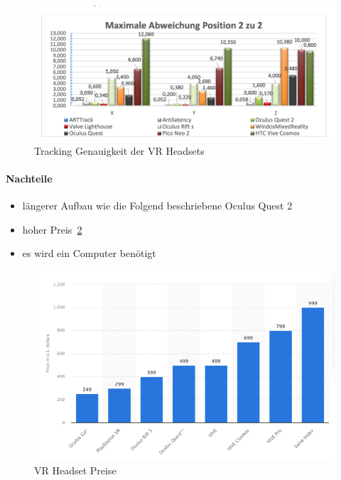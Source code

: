 \begin{figure}
    \centering
    \includegraphics[scale=0.4]{pics/tracking_precision_statistic}
    \caption{Tracking Genauigkeit der VR Headsets~\cite{Macedo_2020}}
    \label{fig:tracking_precision_statistic}
\end{figure}

\paragraph{Nachteile}

\begin{itemize}
    \item längerer Aufbau wie die Folgend beschriebene Oculus Quest 2
    \item hoher Preis~\ref{fig:vr_headset_prices}
    \item es wird ein Computer benötigt
\end{itemize}

\begin{figure}
    \centering
    \includegraphics[scale=0.5]{pics/vr_headset_price_statistic}
    \caption{VR Headset Preise~\cite{ALSOP_2019}}
    \label{fig:vr_headset_prices}
\end{figure}

